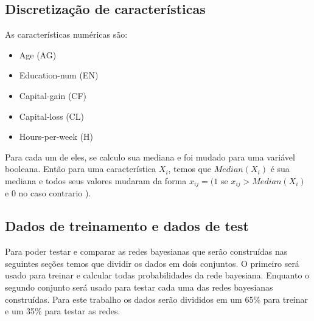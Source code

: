 \subsection{Discretização de características}
\label{subsec:discret}
	As características numéricas são:
	\begin{itemize}
		\item Age (AG)
		\item Education-num (EN)
		\item Capital-gain (CF)
		\item Capital-loss (CL)
		\item Hours-per-week (H)
	\end{itemize}
	Para cada um de eles, se calculo sua mediana e foi mudado para uma variável booleana. Então para uma característica $X_i$, temos que ${Median}( X_i )$ é sua mediana e todos seus valores mudaram da forma $x_{ij} = ( 1$ se $x_{ij} > {Median}( X_i )$ e $0$ no caso contrario ).
	
\subsection{Dados de treinamento e dados de test}
	Para poder testar e comparar as redes bayesianas que serão construídas nas seguintes seções temos que dividir os dados em dois conjuntos. O primeiro será usado para treinar e calcular todas probabilidades da rede bayesiana. Enquanto o segundo conjunto será usado para testar cada uma das redes bayesianas construídas. Para este trabalho os dados serão divididos em um 65\% para treinar e um 35\% para testar as redes.

\clearpage